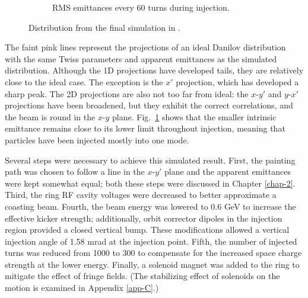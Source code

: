\begin{figure}[!p]
\begin{subfigure}{0.5\textwidth}
        \caption{RMS emittances every 60 turns during injection.}
        \label{fig:Holmes_emittances}
    \end{subfigure}
    \caption{Distribution from the final simulation in \cite{Holmes2018}.}
    \label{fig:Holmes}
\end{figure}
%
The faint pink lines represent the projections of an ideal Danilov distribution with the same Twiss parameters and apparent emittances as the simulated distribution. Although the 1D projections have developed tails, they are relatively close to the ideal case. The exception is the $x'$ projection, which has developed a sharp peak. The 2D projections are also not too far from ideal: the $x$-$y'$ and $y$-$x'$ projections have been broadened, but they exhibit the correct correlations, and the beam is round in the $x$-$y$ plane. Fig.~\ref{fig:Holmes_emittances} shows that the smaller intrinsic emittance remains close to its lower limit throughout injection, meaning that particles have been injected mostly into one mode. 

Several steps were necessary to achieve this simulated result. First, the painting path was chosen to follow a line in the $x$-$y'$ plane and the apparent emittances were kept somewhat equal; both these steps were discussed in Chapter \ref{chap-2}. Third, the ring RF cavity voltages were decreased to better approximate a coasting beam. Fourth, the beam energy was lowered to 0.6 GeV to increase the effective kicker strength; additionally, orbit corrector dipoles in the injection region provided a closed vertical bump. These modifications allowed a vertical injection angle of 1.58 mrad at the injection point. Fifth, the number of injected turns was reduced from 1000 to 300 to compensate for the increased space charge strength at the lower energy. Finally, a solenoid magnet was added to the ring to mitigate the effect of fringe fields. (The stabilizing effect of solenoids on the motion is examined in Appendix \ref{app-C}.)

